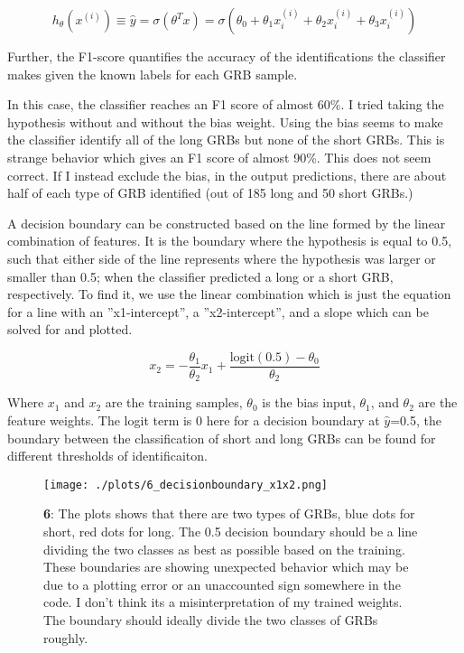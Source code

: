 \begin{equation}
  h_{\theta}(x^{(i)}) \equiv \hat{y} = \sigma(\theta^Tx) = \sigma(\theta_0+\theta_1x_i^{(i)}+\theta_2x_i^{(i)}+\theta_3x_i^{(i)})
\end{equation}

Further, the F1-score quantifies the accuracy of the identifications the classifier makes given the known labels for each GRB sample.

In this case, the classifier reaches an F1 score of almost 60\%. I tried taking the hypothesis without and without the bias weight. Using the bias seems to make the classifier identify all of the long GRBs but none of the short GRBs. This is strange behavior which gives an F1 score of almost 90\%. This does not seem correct. If I instead exclude the bias, in the output predictions, there are about half of each type of GRB identified (out of 185 long and 50 short GRBs.)

A decision boundary can be constructed based on the line formed by the linear combination of features. It is the boundary where the hypothesis is equal to 0.5, such that either side of the line represents where the hypothesis was larger or smaller than 0.5; when the classifier predicted a long or a short GRB, respectively. To find it, we use the linear combination which is just the equation for a line with an ''x1-intercept'', a ''x2-intercept'', and a slope which can be solved for and plotted.

\begin{equation}
  x_2 = -\frac{\theta_1}{\theta_2}x_1 + \frac{\text{logit}(0.5)-\theta_0}{\theta_2}
\end{equation}

Where $x_1$ and $x_2$ are the training samples, $\theta_0$ is the bias input, $\theta_1$, and $\theta_2$ are the feature weights. The logit term is 0 here for a decision boundary at $\hat{y}$=0.5, the boundary between the classification of short and long GRBs can be found for different thresholds of identificaiton.

\begin{figure}[h!]
  \centering
  \texttt{[image: ./plots/6\_decisionboundary\_x1x2.png]}
  \caption{\textbf{6}: The plots shows that there are two types of GRBs, blue dots for short, red dots for long. The 0.5 decision boundary should be a line dividing the two classes as best as possible based on the training. These boundaries are showing unexpected behavior which may be due to a plotting error or an unaccounted sign somewhere in the code. I don't think its a misinterpretation of my trained weights. The boundary should ideally divide the two classes of GRBs roughly.}
  \label{fig:decisionboundary1}
\end{figure}

